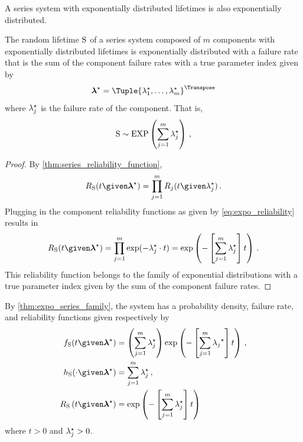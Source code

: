 \documentclass[../main.tex]{subfiles}
\begin{document}
A series system with exponentially distributed lifetimes is also 
exponentially distributed.
\begin{theorem}
\label{thm:expo_series_family}
The random lifetime $\mathrm{S}$ of a series system composed of $m$ components with 
exponentially distributed lifetimes is exponentially distributed with a failure 
rate that is the sum of the component failure rates with a true parameter index 
given by
\begin{equation}
    \tparam{\vec\lambda} = \Tuple{\tparam\lambda_1, \ldots, 
    \tparam\lambda_m}^{\Transpose}
\end{equation}
where ${\lambda}^{\star}_j$ is the failure rate of the \jth component. That is,
\begin{equation}
    \mathrm{S} \sim \mathrm{EXP} \left(\sum_{j=1}^{m} {\lambda}^{\star}_j\right)\,,
\end{equation}

\end{theorem}
\begin{proof}
By \cref{thm:series_reliability_function},
\begin{equation}
    \srv_{\sv}(t \given \tparam{\vec\lambda}) = \prod_{j=1}^{m} \srv_j(t \given 
    \tparam\lambda_j)\,.
\end{equation}
Plugging in the component reliability functions as given by 
\cref{eq:expo_reliability} results in
\begin{equation}
    \srv_{\sv}(t \given \tparam{\vec\lambda}) = \prod_{j=1}^{m} 
    \exp(-\tparam\lambda_j \cdot t) =
    \exp \left(-\left [ \sum_{j=1}^{m}{\tparam\lambda_j} \right ] t\right)\,.
\end{equation}
This reliability function belongs to the family of exponential 
distributions with a true parameter index given by the sum of the component 
failure rates.
\end{proof}

By \cref{thm:expo_series_family}, the system has a probability density, 
failure rate, and reliability functions given respectively by
\begin{align}
\label{eq:expo_sys_pdf}
\spdf(t \given \tparam{\vec\lambda}) &=
    \left ( \sum_{j=1}^{m} {\tparam{\lambda}_j} \right ) \exp
    \left(-\left [ \sum_{j=1}^{m}{\tparam{\lambda_j}} \right ] t\right)\,,\\
\label{eq:expo_sys_failure_rate}
\haz_{\sv}(\cdot \given \tparam{\vec\lambda}) &=
    \sum_{j=1}^{m}{\tparam\lambda_j}\,,\\
\label{eq:sys_expo_reliability_function}
\srv_{\sv} \left(t \given \tparam{\vec\lambda} \right) &=
    \exp \left(-\left [ \sum_{j=1}^{m}{\tparam\lambda_j} \right ] t\right)
\end{align}
where $t > 0$ and ${\lambda}^{\star}_j > 0$.
\end{document}

